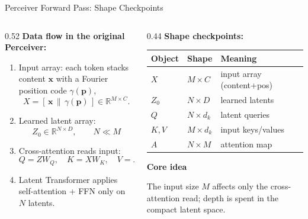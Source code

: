 \documentclass[aspectratio=169,11pt]{beamer}
\newcommand{\colhead}[1]{{\color{HeadBlue}\bfseries #1}\par\vspace{0.25em}}
\begin{document}
\begin{frame}[shrink=8]{Perceiver Forward Pass: Shape Checkpoints}
  \begin{columns}[T]
    \begin{column}{0.52\textwidth}
      \textbf{Data flow in the original Perceiver:}
      \begin{enumerate}
        \item Input array: each token stacks content $\mathbf{x}$ with a Fourier position code $\gamma(\mathbf{p})$,
        \[
          X=[\,\mathbf{x}\,\|\,\gamma(\mathbf{p})\,]\in\mathbb{R}^{M\times C}.
        \]
        \item Learned latent array:
        \[
          Z_0\in\mathbb{R}^{N\times D},\qquad N\ll M
        \]
        \item Cross-attention reads input:
        \[
          Q=ZW_Q,\quad K=XW_K,\quad V=XW_V
        \]
        \item Latent Transformer applies self-attention + FFN only on $N$ latents.
      \end{enumerate}
    \end{column}
    \begin{column}{0.44\textwidth}
      \textbf{Shape checkpoints:}
      \begin{table}
        \centering\scriptsize
        \begin{tabular}{lll}
          \toprule
          \textbf{Object} & \textbf{Shape} & \textbf{Meaning} \\
          \midrule
          $X$ & $M\times C$ & input array (content+pos) \\
          $Z_0$ & $N\times D$ & learned latents \\
          $Q$ & $N\times d_k$ & latent queries \\
          $K,V$ & $M\times d_k$ & input keys/values \\
          $A$ & $N\times M$ & attention map \\
          \bottomrule
        \end{tabular}
      \end{table}

      \vspace{0.4em}
      \colhead{Core idea}
        The input size $M$ affects only the cross-attention read; depth is spent in the compact latent space.
      
    \end{column}
  \end{columns}
\end{frame}
\end{document}
